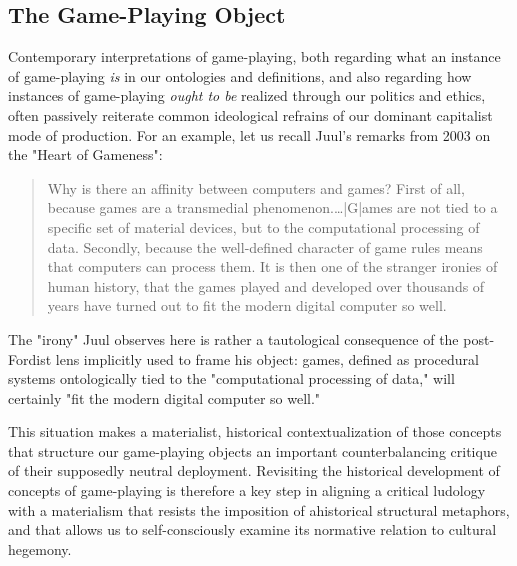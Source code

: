 \subsection*{The Game-Playing Object}
Contemporary interpretations of game-playing, both regarding what an instance of game-playing \emph{is} in our ontologies and definitions, and also regarding how instances of game-playing \emph{ought to be} realized through our politics and ethics, often passively reiterate common ideological refrains of our dominant capitalist mode of production. For an example, let us recall Juul's remarks from 2003 on the "Heart of Gameness": \blockquote{
  Why is there an affinity between computers and games? First of all, because games are a transmedial phenomenon.…|G|ames are not tied to a specific set of material devices, but to the computational processing of data. Secondly, because the well-defined character of game rules means that computers can process them. It is then one of the stranger ironies of human history, that the games played and developed over thousands of years have turned out to fit the modern digital computer so well. \autocite*{Juul2003-sx}
  }
The "irony" Juul observes here is rather a tautological consequence of the post-Fordist lens implicitly used to frame his object: games, defined as procedural systems ontologically tied to the "computational processing of data," will certainly "fit the modern digital computer so well."

This situation makes a materialist, historical contextualization of those concepts that structure our game-playing objects an important counterbalancing critique of their supposedly neutral deployment. Revisiting the historical development of concepts of game-playing is therefore a key step in aligning a critical ludology with a materialism that resists the imposition of ahistorical structural metaphors, and that allows us to self-consciously examine its normative relation to cultural hegemony.

